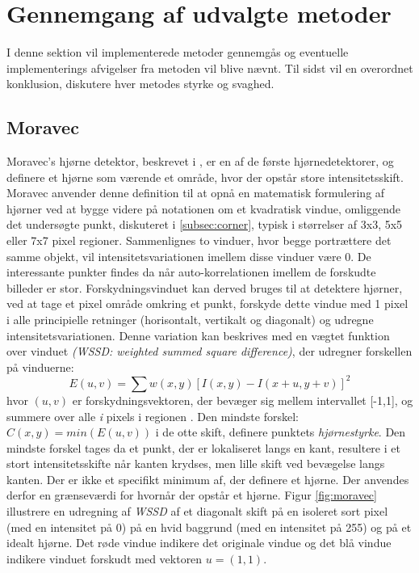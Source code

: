 \chapter{Gennemgang af udvalgte metoder}\label{sec:detmet}
I denne sektion vil implementerede metoder gennemgås og eventuelle implementerings afvigelser fra metoden vil blive nævnt. Til sidst vil en overordnet konklusion, diskutere hver metodes styrke og svaghed. 
\section{Moravec}\label{sec:moravec}
Moravec's hjørne detektor, beskrevet i \cite{moravec}, er en af de første hjørnedetektorer, og definere et hjørne som værende et område, hvor der opstår store intensitetsskift. Moravec anvender denne definition til at opnå en matematisk formulering af hjørner ved at bygge videre på notationen om et kvadratisk vindue, omliggende det undersøgte punkt, diskuteret i \ref{subsec:corner}, typisk i størrelser af 3x3, 5x5 eller 7x7 pixel regioner. Sammenlignes to vinduer, hvor begge portrættere det samme objekt, vil intensitetsvariationen imellem disse vinduer være 0.
De interessante punkter findes da når auto-korrelationen imellem de forskudte billeder er stor. Forskydningsvinduet kan derved bruges til at detektere hjørner, ved at tage et pixel område omkring et punkt, forskyde dette vindue med 1 pixel i alle principielle retninger (horisontalt, vertikalt og diagonalt) og udregne intensitetsvariationen. Denne variation kan beskrives med en vægtet funktion over vinduet  \emph{(WSSD: weighted summed square difference)}, der udregner forskellen på vinduerne:
\begin{equation}
E(u,v)= \sum w(x,y)[I(x,y)-I(x+u,y+v)]^2     
\end{equation}
hvor $(u,v)$ er forskydningsvektoren, der bevæger sig mellem intervallet [-1,1], og summere over alle \textit{i} pixels i regionen . Den mindste forskel: $C(x,y)=min(E(u,v))$ i de otte skift, definere punktets \textit{hjørnestyrke}. Den mindste forskel tages da et punkt, der er lokaliseret langs en kant, resultere i et stort intensitetsskifte når kanten krydses, men lille skift ved bevægelse langs kanten. Der er ikke et specifikt minimum af, der definere et hjørne. Der anvendes derfor en grænseværdi for hvornår der opstår et hjørne. Figur \ref{fig:moravec} illustrere en udregning af \textit{WSSD} af et diagonalt skift på en isoleret sort pixel (med en intensitet på 0) på en hvid baggrund (med en intensitet på 255) og på et idealt hjørne. Det røde vindue indikere det originale vindue og det blå vindue indikere  vinduet forskudt med vektoren $u = (1,1)$. 

